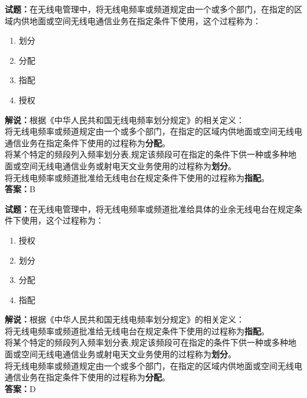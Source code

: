 \documentclass{ctexbook}
\begin{document}
\noindent\textbf{试题：}在无线电管理中，将无线电频率或频道规定由一个或多个部门，在指定的区域内供地面或空间无线电通信业务在指定条件下使用，这个过程称为：
\begin{enumerate}[leftmargin=3em]
\item 划分
\item 分配
\item 指配
\item 授权
\end{enumerate}
\noindent\textbf{解说：}根据《中华人民共和国无线电频率划分规定》的相关定义：\\将无线电频率或频道规定由一个或多个部门，在指定的区域内供地面或空间无线电通信业务在指定条件下使用的过程称为\textbf{分配}。\\将某个特定的频段列入频率划分表,规定该频段可在指定的条件下供一种或多种地面或空间无线电通信业务或射电天文业务使用的过程称为\textbf{划分}。\\将无线电频率或频道批准给无线电台在规定条件下使用的过程称为\textbf{指配}。\\
\textbf{答案：}B

\bigskip




\noindent\textbf{试题：}在无线电管理中，将无线电频率或频道批准给具体的业余无线电台在规定条件下使用，这个过程称为：
\begin{enumerate}[leftmargin=3em]
\item 授权
\item 划分
\item 分配
\item 指配
\end{enumerate}
\noindent\textbf{解说：}根据《中华人民共和国无线电频率划分规定》的相关定义：\\将无线电频率或频道批准给无线电台在规定条件下使用的过程称为\textbf{指配}。\\将某个特定的频段列入频率划分表,规定该频段可在指定的条件下供一种或多种地面或空间无线电通信业务或射电天文业务使用的过程称为\textbf{划分}。\\将无线电频率或频道规定由一个或多个部门，在指定的区域内供地面或空间无线电通信业务在指定条件下使用的过程称为\textbf{分配}。\\
\textbf{答案：}D

\bigskip
\end{document}
